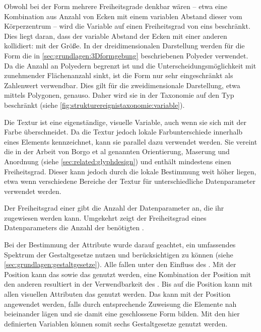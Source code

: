 Obwohl bei der Form mehrere Freiheitsgrade denkbar wären -- etwa eine Kombination aus Anzahl von Ecken mit einem variablen Abstand dieser vom Körperzentrum -- wird die Variable auf einen Freiheitsgrad von eins beschränkt. Dies liegt daran, dass der variable Abstand der Ecken mit einer anderen  kollidiert: mit der Größe. In der dreidimensionalen Darstellung werden für die Form die in \autoref{sec:grundlagen:3Dformgebung} beschriebenen Polyeder verwendet. Da die Anzahl an Polyedern begrenzt ist und die Unterscheidungsmöglichkeit mit zunehmender Flächenanzahl sinkt, ist die Form nur sehr eingeschränkt als Zahlenwert verwendbar. Dies gilt für die zweidimensionale Darstellung, etwa mittels Polygonen, genauso. Daher wird sie in der Taxonomie auf den Typ  beschränkt (siehe \autoref{fig:strukturereignistaxonomie:variable}).

Die Textur ist eine eigenständige, visuelle Variable, auch wenn sie sich mit der Farbe
überschneidet. Da die Textur jedoch lokale Farbunterschiede innerhalb eines Elements kennzeichnet, kann sie parallel dazu verwendet werden. Sie vereint die in der Arbeit von Borgo et al genannten  Orientierung, Maserung und Anordnung (siehe \autoref{sec:related:glyphdesign}) und enthält mindestens einen Freiheitsgrad. Dieser kann jedoch durch die lokale Bestimmung weit höher liegen, etwa wenn verschiedene Bereiche der Textur für unterschiedliche Datenparameter verwendet werden.

Der Freiheitsgrad einer  gibt die Anzahl der Datenparameter an, die ihr zugewiesen werden kann. Umgekehrt zeigt der Freiheitsgrad eines Datenparameters die Anzahl der benötigten .

Bei der Bestimmung der Attribute wurde darauf geachtet, ein umfassendes Spektrum der Gestaltgesetze nutzen und berücksichtigen zu können (siehe \autoref{sec:grundlagen:gestaltgesetze}). Alle  fallen unter den Einfluss des . Mit der Position kann das  sowie das  genutzt werden, eine Kombination der Position mit den anderen  resultiert in der Verwendbarkeit des . Bis auf die Position kann mit allen visuellen Attributen das  genutzt werden. Das  kann mit der Position angewendet werden, falls durch entsprechende Zuweisung die Elemente nah beieinander lägen und sie damit eine geschlossene Form bilden. Mit den hier definierten Variablen können somit sechs Gestaltgesetze genutzt werden.

